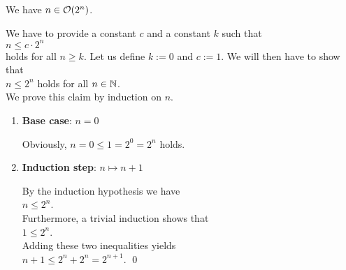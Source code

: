 \example
We have  $n \in \mathcal{O}(2^n)$. 

\proof
We have to provide a constant $c$ and a constant $k$
such that 
\\[0.2cm]
\hspace*{1.3cm}
$ n \leq c \cdot 2^n$ 
\\[0.2cm]
holds for all $n \geq k$.  Let us define $k := 0$ and $c := 1$.  We will then have to show that \\[0.2cm]
\hspace*{1.3cm} $n \leq 2^n$ \quad holds for all $n \in {\mathbb N}$.
\\[0.2cm]
We prove this claim by induction on $n$.
\begin{enumerate}
\item \textbf{Base case}: $n = 0$

      Obviously, $n = 0 \leq 1 = 2^0 = 2^n$ holds.  
\item \textbf{Induction step}: $n \mapsto n + 1$

      By the induction hypothesis we have 
      \\[0.2cm]
      \hspace*{1.3cm}
      $n \leq 2^n$.    
      \\[0.2cm]
      Furthermore, a trivial induction shows that
      \\[0.2cm]
      \hspace*{1.3cm}
      $1 \leq 2^n$.
      \\[0.2cm]
      Adding these two inequalities yields
      \\[0.2cm]
      \hspace*{1.3cm} $n+1 \leq 2^n + 2^n = 2^{n+1}$. \qed
\end{enumerate}

